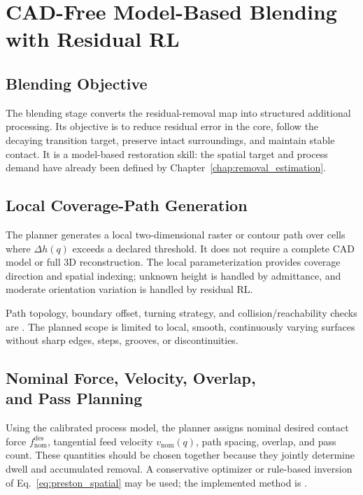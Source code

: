 \chapter{CAD-Free Model-Based Blending with Residual RL}
\label{chap:blending}

\section{Blending Objective}
The blending stage converts the residual-removal map into structured additional processing. Its objective is to reduce residual error in the core, follow the decaying transition target, preserve intact surroundings, and maintain stable contact. It is a model-based restoration skill: the spatial target and process demand have already been defined by Chapter~\ref{chap:removal_estimation}.

\section{Local Coverage-Path Generation}
The planner generates a local two-dimensional raster or contour path over cells where \(\Delta h(q)\) exceeds a declared threshold. It does not require a complete CAD model or full 3D reconstruction. The local parameterization provides coverage direction and spatial indexing; unknown height is handled by admittance, and moderate orientation variation is handled by residual RL.

Path topology, boundary offset, turning strategy, and collision/reachability checks are . The planned scope is limited to local, smooth, continuously varying surfaces without sharp edges, steps, grooves, or discontinuities.

\section[Nominal Force, Velocity, Overlap, and Pass Planning]{Nominal Force, Velocity, Overlap,\\ and Pass Planning}
Using the calibrated process model, the planner assigns nominal desired contact force \(f_{\mathrm{nom}}^{\mathrm{des}}\), tangential feed velocity \(v_{\mathrm{nom}}(q)\), path spacing, overlap, and pass count. These quantities should be chosen together because they jointly determine dwell and accumulated removal. A conservative optimizer or rule-based inversion of Eq.~\eqref{eq:preston_spatial} may be used; the implemented method is .

